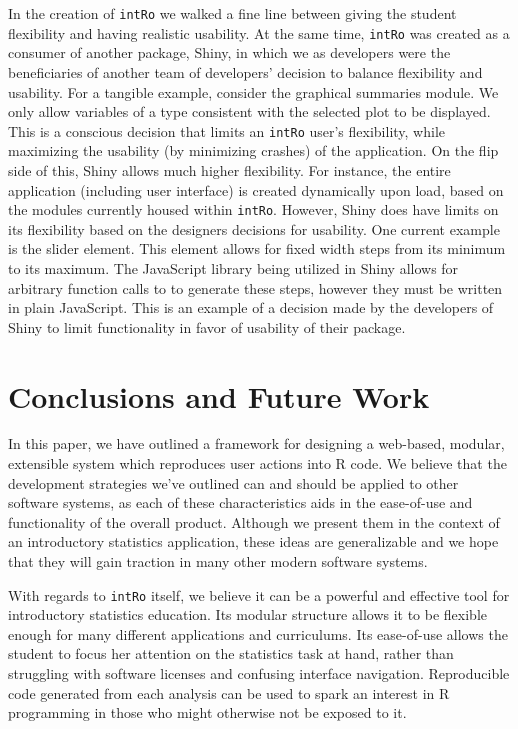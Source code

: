 \documentclass[12pt,]{article}
\begin{document}
In the creation of \texttt{intRo} we walked a fine line between giving
the student flexibility and having realistic usability. At the same
time, \texttt{intRo} was created as a consumer of another package,
Shiny, in which we as developers were the beneficiaries of another team
of developers' decision to balance flexibility and usability. For a
tangible example, consider the graphical summaries module. We only allow
variables of a type consistent with the selected plot to be displayed.
This is a conscious decision that limits an \texttt{intRo} user's
flexibility, while maximizing the usability (by minimizing crashes) of
the application. On the flip side of this, Shiny allows much higher
flexibility. For instance, the entire application (including user
interface) is created dynamically upon load, based on the modules
currently housed within \texttt{intRo}. However, Shiny does have limits
on its flexibility based on the designers decisions for usability. One
current example is the slider element. This element allows for fixed
width steps from its minimum to its maximum. The JavaScript library
being utilized in Shiny allows for arbitrary function calls to to
generate these steps, however they must be written in plain JavaScript.
This is an example of a decision made by the developers of Shiny to
limit functionality in favor of usability of their package.

\section{Conclusions and Future Work}\label{conclusions-and-future-work}

In this paper, we have outlined a framework for designing a web-based,
modular, extensible system which reproduces user actions into R code. We
believe that the development strategies we've outlined can and should be
applied to other software systems, as each of these characteristics aids
in the ease-of-use and functionality of the overall product. Although we
present them in the context of an introductory statistics application,
these ideas are generalizable and we hope that they will gain traction
in many other modern software systems.

With regards to \texttt{intRo} itself, we believe it can be a powerful
and effective tool for introductory statistics education. Its modular
structure allows it to be flexible enough for many different
applications and curriculums. Its ease-of-use allows the student to
focus her attention on the statistics task at hand, rather than
struggling with software licenses and confusing interface navigation.
Reproducible code generated from each analysis can be used to spark an
interest in R programming in those who might otherwise not be exposed to
it.
\end{document}
